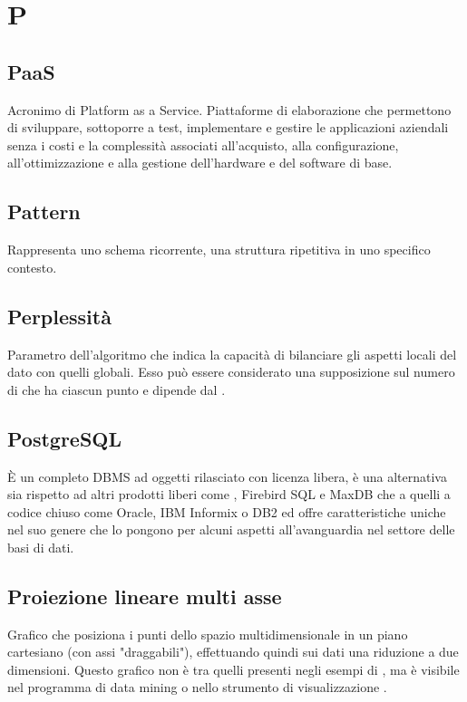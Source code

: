 \section*{P}
\markright{}
\subsection*{PaaS}
Acronimo di Platform as a Service. Piattaforme di elaborazione che permettono di sviluppare, sottoporre a test, implementare e gestire le applicazioni aziendali senza i costi e la complessità associati all'acquisto, alla configurazione, all'ottimizzazione e alla gestione dell'hardware e del software di base. 

\subsection*{Pattern}
Rappresenta uno schema ricorrente, una struttura ripetitiva in uno specifico contesto. 

\subsection*{Perplessità}
Parametro dell'algoritmo  che indica la capacità di bilanciare gli aspetti locali del dato con quelli globali. Esso può essere considerato una supposizione sul numero di  che ha ciascun punto e dipende dal .  

\subsection*{PostgreSQL}
È un completo DBMS ad oggetti rilasciato con licenza libera, è una alternativa sia rispetto ad altri prodotti liberi come , Firebird SQL e MaxDB che a quelli a codice chiuso come Oracle, IBM Informix o DB2 ed offre caratteristiche uniche nel suo genere che lo pongono per alcuni aspetti all'avanguardia nel settore delle basi di dati.

\subsection*{Proiezione lineare multi asse}
Grafico che posiziona i punti dello spazio multidimensionale in un piano cartesiano (con assi "draggabili"), effettuando quindi sui dati una riduzione a due dimensioni. Questo grafico non è tra quelli presenti negli esempi di , ma è visibile nel programma di data mining  o nello strumento di visualizzazione .

